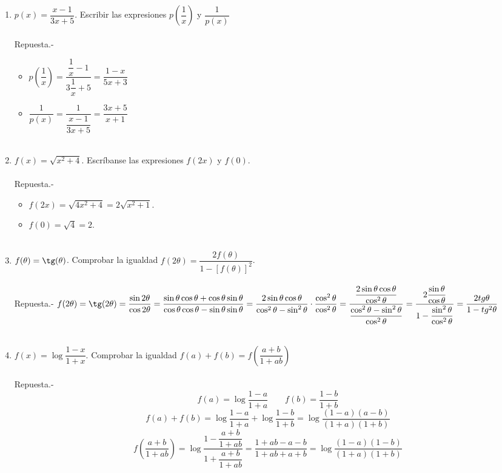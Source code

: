 \begin{enumerate}
\begin{enumerate}[\bfseries a)]
	\end{enumerate}

    \item $p(x) = \dfrac{x-1}{3x+5}$. Escribir las expresiones $p \left(\dfrac{1}{x}\right)$ y $\dfrac{1}{p(x)}$\\\\
	Repuesta.-\;
	\begin{itemize}
	    \item $p\left(\dfrac{1}{x}\right) = \dfrac{\dfrac{1}{x} - 1}{3\dfrac{1}{x} + 5}= \dfrac{1-x}{5x+3}$\\
	    \item $\dfrac{1}{p(x)} = \dfrac{1}{\dfrac{x-1}{3x+5}} = \dfrac{3x+5}{x+1}$\\\\
	\end{itemize}

    \item $f(x)=\sqrt{x^2 + 4}$. Escríbanse las expresiones $f(2x)$ y $f(0)$.\\\\
	Repuesta.-\; 
	\begin{itemize}
	    \item $f(2x)=\sqrt{4x^2 + 4} = 2\sqrt{x^2 + 1}$.
	    \item $f(0)=\sqrt{4}=2$.\\\\
	\end{itemize}

    \item $f(\theta)=\tg(\theta)$. Comprobar la igualdad $f(2\theta)=\dfrac{2f(\theta)}{1-\left[f(\theta)\right]^2}$.\\\\
	Repuesta.-\; $f(2\theta)=\tg(2\theta )= \dfrac{\sin 2\theta}{\cos 2\theta} = \dfrac{\sin \theta \cos \theta + \cos \theta \sin \theta}{\cos \theta \cos \theta - \sin \theta \sin \theta} = \dfrac{2\sin \theta \cos \theta}{\cos^2 \theta - \sin^2\theta}\cdot \dfrac{\cos^2 \theta}{\cos^2 \theta} = \dfrac{\dfrac{2\sin \theta \cos \theta}{\cos^2 \theta}}{\dfrac{\cos^2 \theta - \sin^2 \theta}{\cos^2 \theta}} = \dfrac{2\dfrac{\sin \theta}{\cos \theta}}{1-\dfrac{\sin^2 \theta}{\cos^2 \theta}} = \dfrac{2tg \theta}{1- tg^2 \theta}$\\\\

    \item $f(x)=\log \dfrac{1-x}{1+x}$. Comprobar la igualdad $f(a)+f(b)=f\left(\dfrac{a+b}{1+ab}\right)$ \\\\
	Repuesta.-\; $$f(a)=\log \dfrac{1-a}{1+a} \qquad f(b)=\dfrac{1-b}{1+b}$$ 
	$$f(a)+f(b)=\log \dfrac{1-a}{1+a} + \log\dfrac{1-b}{1+b}=\log \dfrac{(1-a)(a-b)}{(1+a)(1+b)}$$
	$$f\left(\dfrac{a+b}{1+ab}\right)=\log \dfrac{1-\dfrac{a+b}{1+ab}}{1+\dfrac{a+b}{1+ab}}=\dfrac{1+ab-a-b}{1+ab+a+b}=\log \dfrac{(1-a)(1-b)}{(1+a)(1+b)}$$\\\\


\end{enumerate}
